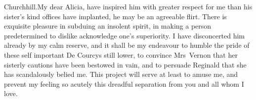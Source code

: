 \begin{mail}{Churchhill.}{My dear Alicia,}
have inspired him with greater respect for me than his sister's kind offices have implanted, he may be an agreeable flirt. There is exquisite pleasure in subduing an insolent spirit, in making a person predetermined to dislike acknowledge one's superiority. I have disconcerted him already by my calm reserve, and it shall be my endeavour to humble the pride of these self important De Courcys still lower, to convince Mrs~Vernon that her sisterly cautions have been bestowed in vain, and to persuade Reginald that she has scandalously belied me. This project will serve at least to amuse me, and prevent my feeling so acutely this dreadful separation from you and all whom I love.

\end{mail}